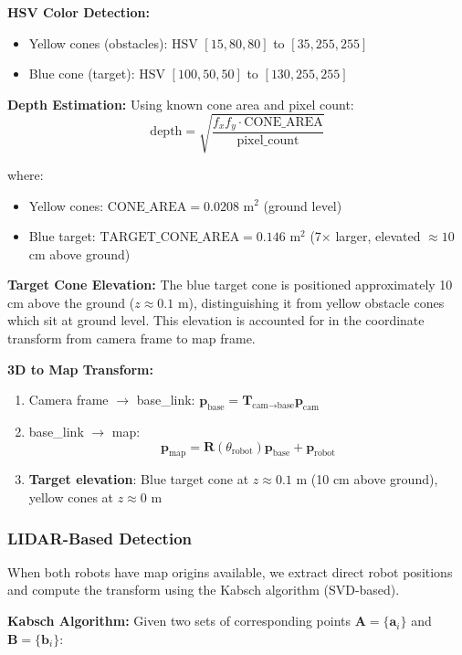 \documentclass[11pt]{article}
\begin{document}
\textbf{HSV Color Detection:}
\begin{itemize}
    \item Yellow cones (obstacles): HSV $[15, 80, 80]$ to $[35, 255, 255]$
    \item Blue cone (target): HSV $[100, 50, 50]$ to $[130, 255, 255]$
\end{itemize}

\textbf{Depth Estimation:}
Using known cone area and pixel count:
\[
\text{depth} = \sqrt{\frac{f_x f_y \cdot \text{CONE\_AREA}}{\text{pixel\_count}}}
\]

where:
\begin{itemize}
    \item Yellow cones: $\text{CONE\_AREA} = 0.0208$ m$^2$ (ground level)
    \item Blue target: $\text{TARGET\_CONE\_AREA} = 0.146$ m$^2$ (7$\times$ larger, elevated $\approx 10$ cm above ground)
\end{itemize}

\textbf{Target Cone Elevation:} The blue target cone is positioned approximately 10 cm above the ground ($z \approx 0.1$ m), distinguishing it from yellow obstacle cones which sit at ground level. This elevation is accounted for in the coordinate transform from camera frame to map frame.

\textbf{3D to Map Transform:}
\begin{enumerate}
    \item Camera frame $\rightarrow$ base\_link: $\mathbf{p}_{\text{base}} = \mathbf{T}_{\text{cam}\rightarrow\text{base}} \mathbf{p}_{\text{cam}}$
    \item base\_link $\rightarrow$ map: 
    \[
    \mathbf{p}_{\text{map}} = \mathbf{R}(\theta_{\text{robot}}) \mathbf{p}_{\text{base}} + \mathbf{p}_{\text{robot}}
    \]
    \item \textbf{Target elevation}: Blue target cone at $z \approx 0.1$ m (10 cm above ground), yellow cones at $z \approx 0$ m
\end{enumerate}

\subsubsection{LIDAR-Based Detection}

When both robots have map origins available, we extract direct robot positions and compute the transform using the Kabsch algorithm (SVD-based).

\textbf{Kabsch Algorithm:}
Given two sets of corresponding points $\mathbf{A} = \{\mathbf{a}_i\}$ and $\mathbf{B} = \{\mathbf{b}_i\}$:
\end{document}
